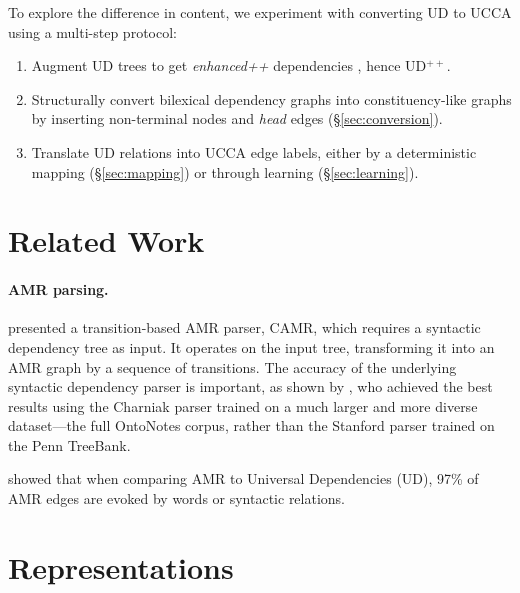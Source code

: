 \documentclass[11pt,a4paper]{article}
\begin{document}
To explore the difference in content, we experiment with converting UD to UCCA
using a multi-step protocol:
\begin{enumerate}
\item Augment UD trees to get \textit{enhanced++} dependencies \cite{SCHUSTER16.779}, hence UD$^{++}$.
\item Structurally convert bilexical dependency graphs into constituency-like graphs by inserting
  non-terminal nodes and \textit{head} edges (\S\ref{sec:conversion}).
\item Translate UD relations into UCCA edge labels,
  either by a deterministic mapping (\S\ref{sec:mapping})
  or through learning (\S\ref{sec:learning}).
\end{enumerate}

\section{Related Work}\label{sec:related_work}

\paragraph{AMR parsing.}

\citet{wang2015transition,wang-xue-pradhan:2015:ACL-IJCNLP,wang-EtAl:2016:SemEval,goodman2016noise,wang2017getting}
presented a transition-based AMR parser, CAMR, which requires a
syntactic dependency tree as input.
It operates on the input tree, transforming it into an AMR graph
by a sequence of transitions.
The accuracy of the underlying syntactic dependency parser is important,
as shown by \citet{wang-xue-pradhan:2015:ACL-IJCNLP},
who achieved the best results using the Charniak parser trained on a
much larger and more diverse dataset---the full OntoNotes corpus,
rather than the Stanford parser trained on the Penn TreeBank.

\citet{szubert2018structured} showed that when comparing AMR to Universal Dependencies (UD),
97\% of AMR edges are evoked by words or syntactic relations.



\section{Representations}\label{sec:representations}
\end{document}
